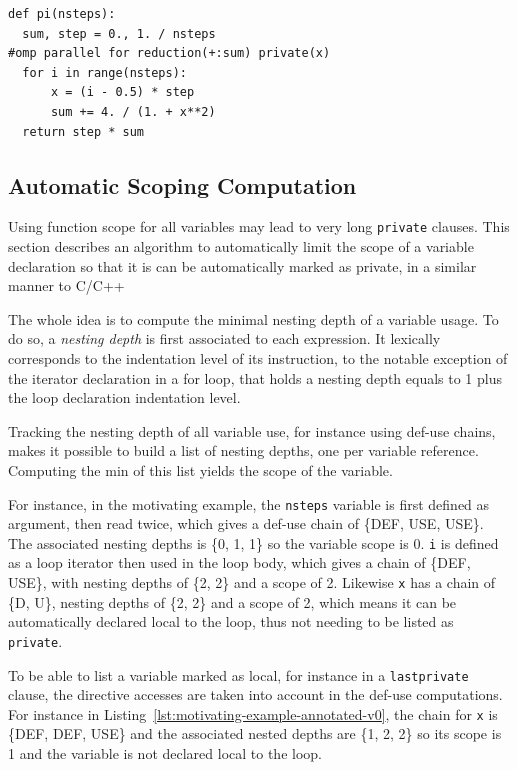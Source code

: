 \documentclass[conference]{IEEEtran}
\begin{document}
\begin{lstlisting}[float, label={lst:motivating-example-annotated-v0}, caption={Motivating
example: computing $\pi$ in Python with OpenMP.}]
def pi(nsteps):
  sum, step = 0., 1. / nsteps
#omp parallel for reduction(+:sum) private(x)
  for i in range(nsteps):
      x = (i - 0.5) * step
      sum += 4. / (1. + x**2)
  return step * sum
\end{lstlisting}

\subsection{Automatic Scoping Computation}

Using function scope for all variables may lead to very long \texttt{private}
clauses. This section describes an algorithm to automatically limit the scope of
a variable declaration so that it is can be automatically marked as private, in
a similar manner to C/C++

The whole idea is to compute the minimal nesting depth of a variable usage. To
do so, a \emph{nesting depth} is first associated to each expression. It
lexically corresponds to the indentation level of its instruction, to the
notable exception of the iterator declaration in a for loop, that holds a
nesting depth equals to 1 plus the loop declaration indentation level.

Tracking the nesting depth of all variable use, for instance using def-use
chains, makes it possible to build a list of nesting depths, one per variable
reference. Computing the min of this list yields the scope of the variable.

For instance, in the motivating example, the \texttt{nsteps} variable is first
defined as argument, then read twice, which gives a def-use chain of
\{DEF, USE, USE\}. The associated nesting depths is
\{0, 1, 1\} so the variable scope is 0. \texttt{i} is defined as a loop iterator then
used in the loop body, which gives a chain of \{DEF, USE\}, with nesting
depths of \{2, 2\} and a scope of 2. Likewise \texttt{x} has a chain
of \{D, U\}, nesting depths of \{2, 2\} and a scope of 2, which means it can be
automatically declared local to the loop, thus not needing to be listed as
\texttt{private}.

To be able to list a variable marked as local, for instance in a
\texttt{lastprivate} clause, the directive accesses are taken into account in
the def-use computations. For instance in
Listing~\ref{lst:motivating-example-annotated-v0}, the chain for \texttt{x} is
\{DEF, DEF, USE\} and the associated nested depths are \{1, 2, 2\} so its scope
is 1 and the variable is not declared local to the loop.
\end{document}
